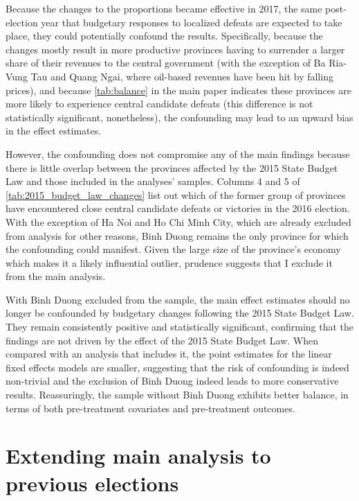 \documentclass[12pt]{article}
\newcommand{\1}{\mathbbm{1}}
\begin{document}
Because the changes to the proportions became effective in 2017, the same post-election year that budgetary responses to localized defeats are expected to take place, they could potentially confound the results. Specifically, because the changes mostly result in more productive provinces having to surrender a larger share of their revenues to the central government (with the exception of Ba Ria-Vung Tau and Quang Ngai, where oil-based revenues have been hit by falling prices), and because \autoref{tab:balance} in the main paper indicates these provinces are more likely to experience central candidate defeats (this difference is not statistically significant, nonetheless), the confounding may lead to an upward bias in the effect estimates.

However, the confounding does not compromise any of the main findings because there is little overlap between the provinces affected by the 2015 State Budget Law and those included in the analyses' samples. Columns 4 and 5 of \autoref{tab:2015_budget_law_changes} list out which of the former group of provinces have encountered close central candidate defeats or victories in the 2016 election. With the exception of Ha Noi and Ho Chi Minh City, which are already excluded from analysis for other reasons, Binh Duong remains the only province for which the confounding could manifest. Given the large size of the province's economy which makes it a likely influential outlier, prudence suggests that I exclude it from the main analysis.

With Binh Duong excluded from the sample, the main effect estimates should no longer be confounded by budgetary changes following the 2015 State Budget Law. They remain consistently positive and statistically significant, confirming that the findings are not driven by the effect of the 2015 State Budget Law. When compared with an analysis that includes it, the point estimates for the linear fixed effects models are smaller, suggesting that the risk of confounding is indeed non-trivial and the exclusion of Binh Duong indeed leads to more conservative results. Reassuringly, the sample without Binh Duong exhibits better balance, in terms of both pre-treatment covariates and pre-treatment outcomes.

\clearpage

\section{Extending main analysis to previous elections}
\label{app:previous_elections}
\end{document}
